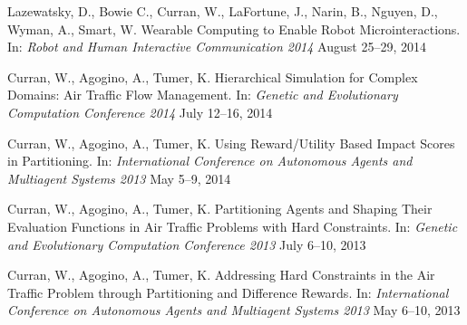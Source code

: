 \documentclass[10pt]{article}
\renewcommand{\section}[1]{\pagebreak[3]%
    \vspace{1.3\baselineskip}%
    \phantomsection\addcontentsline{toc}{section}{#1}%
    \noindent\llap{\scshape\smash{\parbox[t]{\marginparwidth}{\hyphenpenalty=10000\raggedright #1}}}%
    \vspace{-\baselineskip}\par}
\begin{document}
\begin{bibenum}
	\item Lazewatsky, D., Bowie C., Curran, W., LaFortune, J., Narin, B., Nguyen, D., Wyman, A., Smart, W.
    Wearable Computing to Enable Robot Microinteractions.
    In: \emph{Robot and Human Interactive Communication 2014} August 25--29, 2014
   
    \item Curran, W., Agogino, A., Tumer, K.
    Hierarchical Simulation for Complex Domains: Air Traffic Flow Management.
    In: \emph{Genetic and Evolutionary Computation Conference 2014} July 12--16, 2014   

    \item Curran, W., Agogino, A., Tumer, K.  
    Using Reward/Utility Based Impact Scores in Partitioning.
    In: \emph{International Conference on Autonomous Agents and Multiagent Systems 2013} May 5--9, 2014   
    
    \item Curran, W., Agogino, A., Tumer, K.  
    Partitioning Agents and Shaping Their Evaluation Functions in Air Traffic Problems with Hard Constraints.
    In: \emph{Genetic and Evolutionary Computation Conference 2013} July 6--10, 2013
    
    \item Curran, W., Agogino, A., Tumer, K.
    Addressing Hard Constraints in the Air Traffic Problem through Partitioning and Difference Rewards.
    In: \emph{International Conference on Autonomous Agents and Multiagent Systems 2013} May 6--10, 2013
    
        
 
\end{bibenum}
\end{document}

